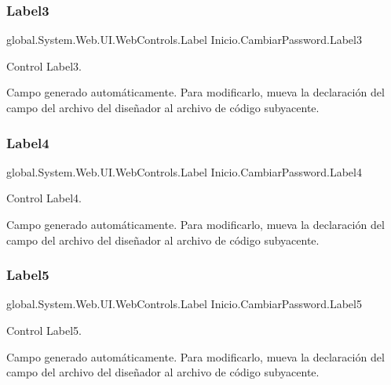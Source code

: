\subsubsection{\texorpdfstring{Label3}{Label3}}
{\footnotesize\ttfamily global.\+System.\+Web.\+U\+I.\+Web\+Controls.\+Label Inicio.\+Cambiar\+Password.\+Label3\hspace{0.3cm}{\ttfamily [protected]}}



Control Label3. 

Campo generado automáticamente. Para modificarlo, mueva la declaración del campo del archivo del diseñador al archivo de código subyacente. \mbox{\label{class_inicio_1_1_cambiar_password_a5c90deffe35773405ff5ec7a875eb035}} 
\subsubsection{\texorpdfstring{Label4}{Label4}}
{\footnotesize\ttfamily global.\+System.\+Web.\+U\+I.\+Web\+Controls.\+Label Inicio.\+Cambiar\+Password.\+Label4\hspace{0.3cm}{\ttfamily [protected]}}



Control Label4. 

Campo generado automáticamente. Para modificarlo, mueva la declaración del campo del archivo del diseñador al archivo de código subyacente. \mbox{\label{class_inicio_1_1_cambiar_password_adabacc9becc23ab2219428532387a3b0}} 
\subsubsection{\texorpdfstring{Label5}{Label5}}
{\footnotesize\ttfamily global.\+System.\+Web.\+U\+I.\+Web\+Controls.\+Label Inicio.\+Cambiar\+Password.\+Label5\hspace{0.3cm}{\ttfamily [protected]}}



Control Label5. 

Campo generado automáticamente. Para modificarlo, mueva la declaración del campo del archivo del diseñador al archivo de código subyacente. \mbox{\label{class_inicio_1_1_cambiar_password_a97691c6df6a8a92e71fe388ec90bd635}} 
